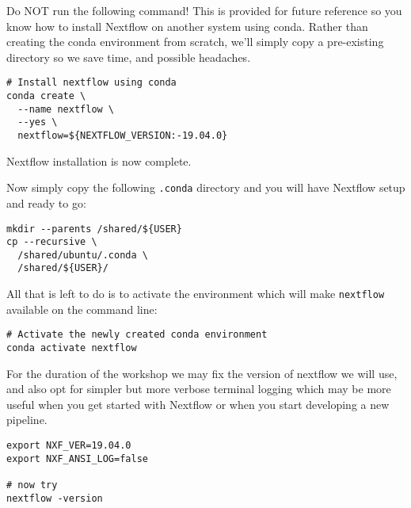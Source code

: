 \begin{warning}

Do NOT run the following command! This is provided for future reference so you know how to install Nextflow on another system using conda. Rather than
creating the conda environment from scratch, we'll simply copy a pre-existing directory so we save time, and possible headaches.

\begin{lstlisting}
# Install nextflow using conda
conda create \
  --name nextflow \
  --yes \
  nextflow=${NEXTFLOW_VERSION:-19.04.0}
\end{lstlisting}


Nextflow installation is now complete.

\end{warning}



Now simply copy the following \texttt{.conda} directory and you
will have Nextflow setup and ready to go:

\begin{steps}
\begin{lstlisting}
mkdir --parents /shared/${USER}
cp --recursive \
  /shared/ubuntu/.conda \
  /shared/${USER}/
\end{lstlisting}
\end{steps}

All that is left to do is to activate the environment which will make \texttt{nextflow} available on the command line:
\begin{steps}
\begin{lstlisting}
# Activate the newly created conda environment
conda activate nextflow
\end{lstlisting}

\end{steps}






For the duration of the workshop we may fix the version of nextflow we will use, 
and also opt for simpler but more verbose terminal logging 
which may be more useful when you get started with Nextflow 
or when you start developing a new pipeline.

\begin{steps}
\begin{lstlisting}
export NXF_VER=19.04.0
export NXF_ANSI_LOG=false

# now try
nextflow -version
\end{lstlisting}
\end{steps}

